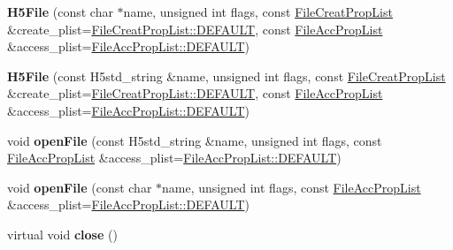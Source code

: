 \begin{DoxyCompactItemize}
\mbox{\label{class_h5_1_1_h5_file_af25054898de738072217e274217a278c}} 
{\bfseries H5\+File} (const char $\ast$name, unsigned int flags, const \hyperlink{class_h5_1_1_file_creat_prop_list}{File\+Creat\+Prop\+List} \&create\+\_\+plist=\hyperlink{class_h5_1_1_file_creat_prop_list_a4913710830a8ec38fbbda805074377d4}{File\+Creat\+Prop\+List\+::\+D\+E\+F\+A\+U\+LT}, const \hyperlink{class_h5_1_1_file_acc_prop_list}{File\+Acc\+Prop\+List} \&access\+\_\+plist=\hyperlink{class_h5_1_1_file_acc_prop_list_a866e7c16e8840c67a194f3bef8501e48}{File\+Acc\+Prop\+List\+::\+D\+E\+F\+A\+U\+LT})
\item 
\mbox{\label{class_h5_1_1_h5_file_a74bb8e05dde9450227bc27841277375f}} 
{\bfseries H5\+File} (const H5std\+\_\+string \&name, unsigned int flags, const \hyperlink{class_h5_1_1_file_creat_prop_list}{File\+Creat\+Prop\+List} \&create\+\_\+plist=\hyperlink{class_h5_1_1_file_creat_prop_list_a4913710830a8ec38fbbda805074377d4}{File\+Creat\+Prop\+List\+::\+D\+E\+F\+A\+U\+LT}, const \hyperlink{class_h5_1_1_file_acc_prop_list}{File\+Acc\+Prop\+List} \&access\+\_\+plist=\hyperlink{class_h5_1_1_file_acc_prop_list_a866e7c16e8840c67a194f3bef8501e48}{File\+Acc\+Prop\+List\+::\+D\+E\+F\+A\+U\+LT})
\item 
\mbox{\label{class_h5_1_1_h5_file_ab20ea83ffa86b74e13168b6c2fdfd817}} 
void {\bfseries open\+File} (const H5std\+\_\+string \&name, unsigned int flags, const \hyperlink{class_h5_1_1_file_acc_prop_list}{File\+Acc\+Prop\+List} \&access\+\_\+plist=\hyperlink{class_h5_1_1_file_acc_prop_list_a866e7c16e8840c67a194f3bef8501e48}{File\+Acc\+Prop\+List\+::\+D\+E\+F\+A\+U\+LT})
\item 
\mbox{\label{class_h5_1_1_h5_file_ae20ef228e7c2db78d31180d3521319ee}} 
void {\bfseries open\+File} (const char $\ast$name, unsigned int flags, const \hyperlink{class_h5_1_1_file_acc_prop_list}{File\+Acc\+Prop\+List} \&access\+\_\+plist=\hyperlink{class_h5_1_1_file_acc_prop_list_a866e7c16e8840c67a194f3bef8501e48}{File\+Acc\+Prop\+List\+::\+D\+E\+F\+A\+U\+LT})
\item 
\mbox{\label{class_h5_1_1_h5_file_a937dc0b3dd01709ea65b6ff816f96757}} 
virtual void {\bfseries close} ()
\item 
\mbox{\label{class_h5_1_1_h5_file_a99f69dbd676df2186493a3090a5275db}} 

\end{DoxyCompactItemize}
